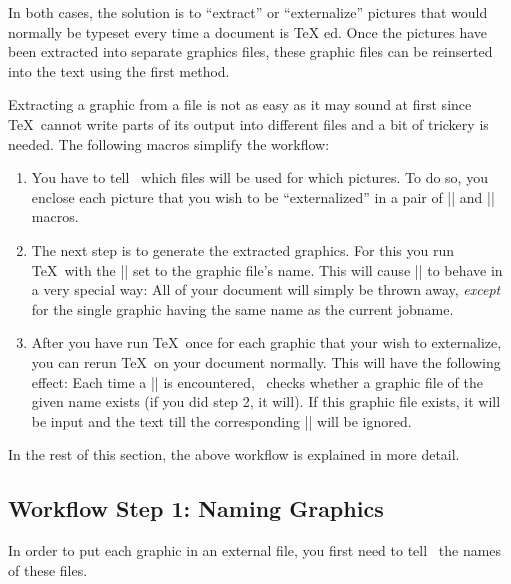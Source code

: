 In both cases, the solution is to ``extract'' or ``externalize''
pictures that would normally be typeset every time a document is \TeX
ed. Once the pictures have been extracted into separate graphics
files, these graphic files can be reinserted into the text using the
first method.

Extracting a graphic from a file is not as easy as it may sound at
first since \TeX\ cannot write parts of its output into different
files and a bit of trickery is needed. The following macros
simplify the workflow: 

\begin{enumerate}
\item You have to tell \pgfname\ which files will be used for which
  pictures. To do so, you enclose each picture that you wish to be
  ``externalized'' in a pair of |\beginpgfgraphicnamed| and
  |\endpgfgraphicnamed| macros.
\item The next step is to generate the extracted graphics. For this
  you run \TeX\ with the |\jobname| set to the graphic file's
  name. This will cause |\pgfname| to behave in a very special way:
  All of your document will simply be thrown away, \emph{except} for
  the single graphic having the same name as the current jobname.
\item After you have run \TeX\ once for each graphic that your wish to
  externalize, you can rerun \TeX\ on your document normally. This
  will have the following effect: Each time a |\beginpgfgraphicnamed|
  is encountered, \pgfname\ checks whether a graphic file of the given
  name exists (if you did step 2, it will). If this graphic file
  exists, it will be input and the text till the corresponding
  |\endpgfgraphicnamed| will be ignored.
\end{enumerate}

In the rest of this section, the above workflow is explained in more
detail.


\subsection{Workflow Step 1: Naming Graphics}

In order to put each graphic in an external file, you first need to
tell \pgfname\ the names of these files.

